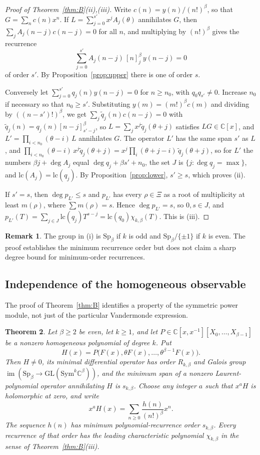 \documentclass[11pt]{amsart}
\newtheorem{thm}{Theorem}[section]
\theoremstyle{definition}
\newtheorem{remark}[thm]{Remark}
\newcommand{\C}{\mathbb C}
\newcommand{\GL}{\mathrm{GL}}
\newcommand{\Sp}{\mathrm{Sp}}
\newcommand{\Sym}{\mathrm{Sym}}
\newcommand{\lc}{\mathrm{lc}}
\newcommand{\ff}[2]{[#1]_{#2}}
\begin{document}
\begin{proof}[Proof of Theorem~\ref{thm:B}(ii),(iii)]
Write $c(n)=y(n)/(n!)^\beta$, so that $G=\sum_nc(n)x^n$. If $L=\sum_{j=0}^{s'}x^jA_j(\theta)$ annihilates $G$, then $\sum_jA_j(n-j)c(n-j)=0$ for all $n$, and multiplying by $(n!)^\beta$ gives the recurrence
\[
\sum_{j=0}^{s'}A_j(n-j)\,\ff nj^{\beta}\,y(n-j)=0
\]
of order $s'$. By Proposition~\ref{prop:upper} there is one of order $s$.

Conversely let $\sum_{j=0}^{s'}q_j(n)y(n-j)=0$ for $n\ge n_0$, with $q_0q_{s'}\ne0$. Increase $n_0$ if necessary so that $n_0\ge s'$. Substituting $y(m)=(m!)^\beta c(m)$ and dividing by $((n-s')!)^\beta$, we get $\sum_j\tilde q_j(n)c(n-j)=0$ with $\tilde q_j(n)=q_j(n)\ff{n-j}{s'-j}^\beta$, so $L=\sum_jx^j\tilde q_j(\theta+j)$ satisfies $LG\in\C[x]$, and $L'=\prod_{i<n_0}(\theta-i)\,L$ annihilates $G$. The operator $L'$ has the same span $s'$ as $L$, and $\prod_{i<n_0}(\theta-i)\,x^j\tilde q_j(\theta+j)=x^j\prod_i(\theta+j-i)\,\tilde q_j(\theta+j)$, so for $L'$ the numbers $\beta j+\deg A_j$ equal $\deg q_j+\beta s'+n_0$, the set $J$ is $\{j:\deg q_j=\max\}$, and $\lc(A_j)=\lc(q_j)$. By Proposition~\ref{prop:lower}, $s'\ge s$, which proves (ii).

If $s'=s$, then $\deg p_{L'}\le s$ and $p_{L'}$ has every $\rho\in\Xi$ as a root of multiplicity at least $m(\rho)$, where $\sum m(\rho)=s$. Hence $\deg p_{L'}=s$, so $0,s\in J$, and $p_{L'}(T)=\sum_{j\in J}\lc(q_j)T^{s-j}=\lc(q_0)\chi_{k,\beta}(T)$. This is (iii).
\end{proof}

\begin{remark}
The group in (i) is $\Sp_\beta$ if $k$ is odd and $\Sp_\beta/\{\pm1\}$ if $k$ is even. The proof establishes the minimum recurrence order but does not claim a sharp degree bound for minimum-order recurrences.
\end{remark}
\subsection{Independence of the homogeneous observable}

The proof of Theorem~\ref{thm:B} identifies a property of the symmetric
power module, not just of the particular Vandermonde expression.

\begin{thm}\label{thm:observable-universality}
Let $\beta\ge2$ be even, let $k\ge1$, and let
$P\in\C[x,x^{-1}][X_0,\ldots,X_{\beta-1}]$ be a nonzero homogeneous
polynomial of degree $k$.  Put
\[
 H(x)=P\bigl(F(x),\theta F(x),\ldots,\theta^{\beta-1}F(x)\bigr).
\]
Then $H\ne0$, its minimal differential operator has order $R_{k,\beta}$
and Galois group $\operatorname{im}(\Sp_\beta\to
\GL(\Sym^k\C^\beta))$, and the minimum span of a nonzero Laurent-polynomial
operator annihilating $H$ is $s_{k,\beta}$.
Choose any integer $a$ such that $x^aH$ is holomorphic at zero, and write
\[
 x^aH(x)=\sum_{n\ge0}\frac{h(n)}{(n!)^\beta}x^n.
\]
The sequence $h(n)$ has minimum polynomial-recurrence order $s_{k,\beta}$.
Every recurrence of that order has the leading characteristic polynomial
$\chi_{k,\beta}$ in the sense of Theorem~\ref{thm:B}\textup{(iii)}.
\end{thm}
\end{document}
